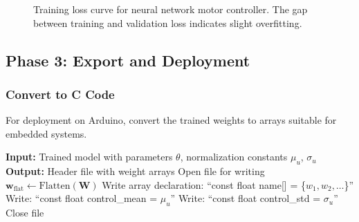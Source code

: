 \begin{figure}[htbp]
\centering
{}
\caption{Training loss curve for neural network motor controller. The gap between training and validation loss indicates slight overfitting.}
\label{fig:training_loss}
\end{figure}

\subsection{Phase 3: Export and Deployment}

\subsubsection{Convert to C Code}

For deployment on Arduino, convert the trained weights to arrays suitable for embedded systems.

\begin{algorithm}[htbp]
\caption{Export Weights for Embedded Deployment}
\label{alg:export_weights}
\begin{algorithmic}[1]
\State \textbf{Input:} Trained model with parameters $\theta$, normalization constants $\mu_u$, $\sigma_u$
\State \textbf{Output:} Header file with weight arrays
\State
{}
    \State Open file for writing
        \State $\mathbf{w}_{\text{flat}} \gets \text{Flatten}(\mathbf{W})$
        \State Write array declaration: ``const float name[] = \{$w_1, w_2, \ldots$\}''
    \EndFor
    \State Write: ``const float control\_mean = $\mu_u$''
    \State Write: ``const float control\_std = $\sigma_u$''
    \State Close file
\EndFunction
\end{algorithmic}
\end{algorithm}

